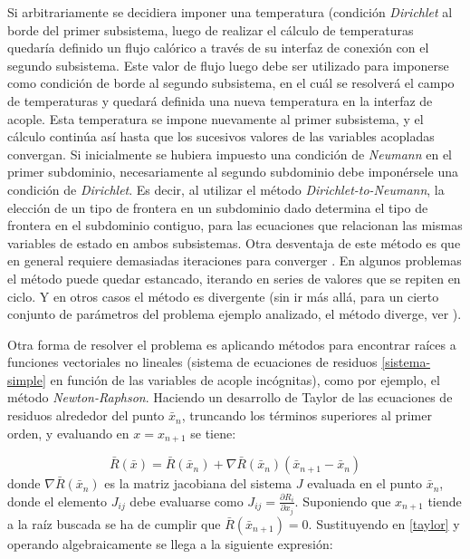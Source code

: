 Si arbitrariamente se decidiera imponer una temperatura (condición \textit{Dirichlet} al borde del primer subsistema,
luego de realizar el cálculo de temperaturas quedaría definido un flujo calórico a través de su interfaz de conexión con el segundo subsistema.
Este valor de flujo luego debe ser utilizado para imponerse como condición de borde al segundo subsistema,
en el cuál se resolverá el campo de temperaturas y quedará definida una nueva temperatura en la interfaz de acople.
Esta temperatura se impone nuevamente al primer subsistema, y el cálculo continúa así hasta que los sucesivos valores de las variables acopladas convergan.
Si inicialmente se hubiera impuesto una condición de \textit{Neumann} en el primer subdominio, necesariamente al segundo subdominio debe imponérsele una condición de \textit{Dirichlet}. Es decir, al utilizar el método \textit{Dirichlet-to-Neumann}, la elección de un tipo de frontera en un subdominio dado determina el tipo de frontera en el subdominio contiguo,
para las ecuaciones que relacionan las mismas variables de estado en ambos subsistemas.
Otra desventaja de este método es que en general requiere demasiadas iteraciones para converger \cite{fede-enief2016}. En algunos problemas el método puede quedar estancado, iterando en series de valores que se repiten en ciclo. Y en otros casos el método es divergente (sin ir más allá, para un cierto conjunto de parámetros del problema ejemplo analizado, el método diverge, ver \cite{coup-strong}).

Otra forma de resolver el problema es aplicando métodos para encontrar raíces a funciones vectoriales no lineales (sistema de ecuaciones de residuos \ref{sistema-simple} en función de las variables de acople incógnitas),
como por ejemplo, el método \textit{Newton-Raphson}.
Haciendo un desarrollo de Taylor de las ecuaciones de residuos alrededor del punto $\bar{x}_n$, truncando los términos superiores al primer orden, y evaluando en $x=x_{n+1}$ se tiene:

\begin{equation}
\bar{R}(\bar{x}) = \bar{R}(\bar{x}_n) + \nabla \bar{R}(\bar{x}_n)(\bar{x}_{n+1}-\bar{x}_n)
\label{taylor}
\end{equation}
donde $\nabla \bar{R}(\bar{x}_n)$ es la matriz jacobiana del sistema $J$ evaluada en el punto $\bar{x}_n$, donde el elemento $J_{ij}$ debe evaluarse como $J_{ij}=\frac{\partial R_i}{\partial x_j}$.
Suponiendo que ${x_{n+1}}$ tiende a la raíz buscada se ha de cumplir que $\bar{R}(\bar{x}_{n+1})=0$. Sustituyendo en \ref{taylor} y operando algebraicamente se llega a la siguiente expresión:

